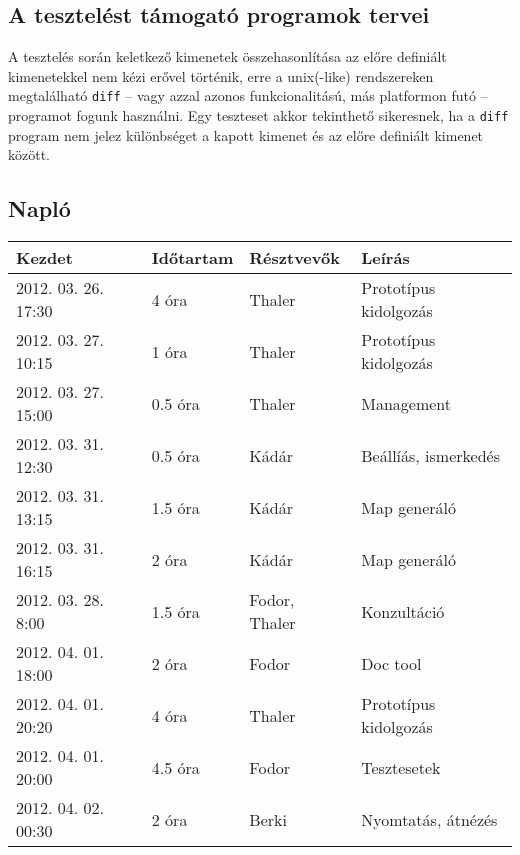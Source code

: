 	\subsection{A tesztelést támogató programok tervei}
		A tesztelés során keletkező kimenetek összehasonlítása az előre definiált kimenetekkel nem kézi erővel történik, erre a unix(-like) rendszereken megtalálható \texttt{diff} -- vagy azzal azonos funkcionalitású, más platformon futó -- programot fogunk használni. Egy teszteset akkor tekinthető sikeresnek, ha a \texttt{diff} program nem jelez különbséget a kapott kimenet és az előre definiált kimenet között.


	\subsection{Napló}
    \begin{center} 
        \begin{tabular}{| l | p{1.9cm} | p{2.6cm} | p{6.1cm} |}
            \hline
                Kezdet & Időtartam & Résztvevők & Leírás \\
            \hline \hline 
2012. 03. 26. 17:30 & 4 óra & Thaler & Prototípus kidolgozás\\ \hline
2012. 03. 27. 10:15 & 1 óra & Thaler & Prototípus kidolgozás\\ \hline
2012. 03. 27. 15:00 & 0.5 óra & Thaler & Management\\ \hline
2012. 03. 31. 12:30 & 0.5 óra & Kádár & Beállíás, ismerkedés\\ \hline
2012. 03. 31. 13:15 & 1.5 óra & Kádár & Map generáló\\ \hline
2012. 03. 31. 16:15 & 2 óra & Kádár & Map generáló\\ \hline
2012. 03. 28. 8:00 & 1.5 óra & Fodor, Thaler & Konzultáció\\ \hline
2012. 04. 01. 18:00 & 2 óra & Fodor & Doc tool\\ \hline
2012. 04. 01. 20:20 & 4 óra & Thaler & Prototípus kidolgozás\\ \hline
2012. 04. 01. 20:00 & 4.5 óra & Fodor & Tesztesetek\\ \hline
2012. 04. 02. 00:30 & 2 óra & Berki & Nyomtatás, átnézés\\ \hline

            \hline
        \end{tabular}
    \end{center}

